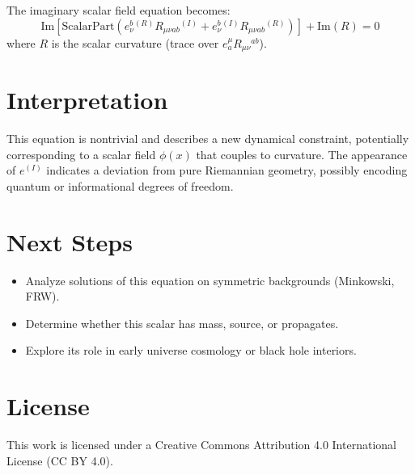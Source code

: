 \documentclass[12pt]{article}
\begin{document}
The imaginary scalar field equation becomes:
\[
\text{Im} \left[ \text{ScalarPart} \left( e^b_\nu{}^{(R)} R_{\mu\nu ab}{}^{(I)} + e^b_\nu{}^{(I)} R_{\mu\nu ab}{}^{(R)} \right) \right] + \text{Im}(R) = 0
\]
where $R$ is the scalar curvature (trace over $e^\mu_a R_{\mu\nu}{}^{ab}$).

\section*{Interpretation}

This equation is nontrivial and describes a new dynamical constraint, potentially corresponding to a scalar field $\phi(x)$ that couples to curvature. The appearance of $e^{(I)}$ indicates a deviation from pure Riemannian geometry, possibly encoding quantum or informational degrees of freedom.

\section*{Next Steps}

\begin{itemize}
\item Analyze solutions of this equation on symmetric backgrounds (Minkowski, FRW).
\item Determine whether this scalar has mass, source, or propagates.
\item Explore its role in early universe cosmology or black hole interiors.
\end{itemize}


\section*{License}
This work is licensed under a Creative Commons Attribution 4.0 International License (CC BY 4.0).
\end{document}
